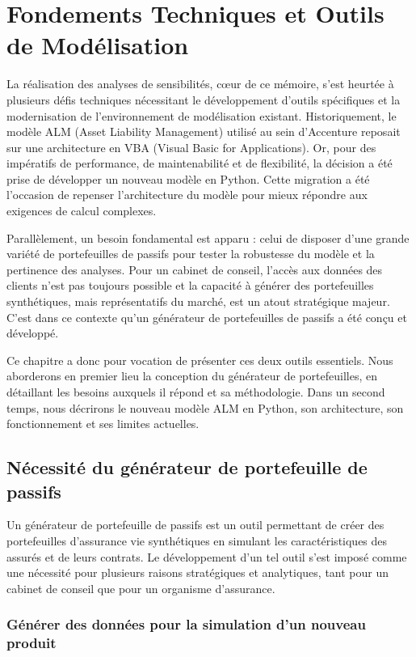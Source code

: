 \chapter{Fondements Techniques et Outils de Modélisation}

La réalisation des analyses de sensibilités, cœur de ce mémoire, s'est heurtée à plusieurs défis techniques nécessitant le développement d'outils spécifiques et la modernisation de l'environnement de modélisation existant. Historiquement, le modèle ALM (Asset Liability Management) utilisé au sein d'Accenture reposait sur une architecture en VBA (Visual Basic for Applications). Or, pour des impératifs de performance, de maintenabilité et de flexibilité, la décision a été prise de développer un nouveau modèle en Python. Cette migration a été l'occasion de repenser l'architecture du modèle pour mieux répondre aux exigences de calcul complexes.

Parallèlement, un besoin fondamental est apparu : celui de disposer d'une grande variété de portefeuilles de passifs pour tester la robustesse du modèle et la pertinence des analyses. Pour un cabinet de conseil, l'accès aux données des clients n'est pas toujours possible et la capacité à générer des portefeuilles synthétiques, mais représentatifs du marché, est un atout stratégique majeur. C'est dans ce contexte qu'un générateur de portefeuilles de passifs a été conçu et développé.

Ce chapitre a donc pour vocation de présenter ces deux outils essentiels. Nous aborderons en premier lieu la conception du générateur de portefeuilles, en détaillant les besoins auxquels il répond et sa méthodologie. Dans un second temps, nous décrirons le nouveau modèle ALM en Python, son architecture, son fonctionnement et ses limites actuelles.

\section{Nécessité du générateur de portefeuille de passifs}

Un générateur de portefeuille de passifs est un outil permettant de créer des portefeuilles d'assurance vie synthétiques en simulant les caractéristiques des assurés et de leurs contrats. Le développement d'un tel outil s'est imposé comme une nécessité pour plusieurs raisons stratégiques et analytiques, tant pour un cabinet de conseil que pour un organisme d'assurance.

\subsection{Générer des données pour la simulation d'un nouveau produit}

